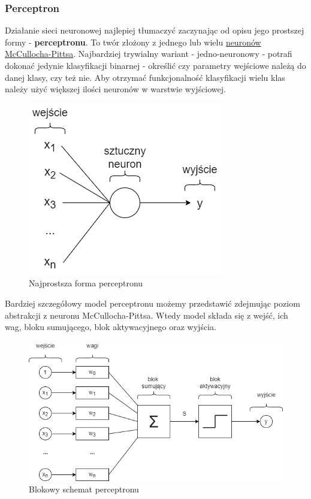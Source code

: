 \pagebreak

\subsubsection{Perceptron}
Działanie sieci neuronowej najlepiej tłumaczyć zaczynając od opisu jego prostszej formy - \textbf{perceptronu}. To twór złożony z jednego lub wielu \underline{neuronów McCullocha-Pittsa}. Najbardziej trywialny wariant - jedno-neuronowy - potrafi dokonać jedynie klasyfikacji binarnej - określić czy parametry wejściowe należą do danej klasy, czy też nie. Aby otrzymać funkcjonalność klasyfikacji wielu klas należy użyć większej ilości neuronów w warstwie wyjściowej.

\begin{figure}[h!]
    \begin{center}
        \includegraphics[scale=0.7]{img/perceptron.png}        
    \end{center}
    \caption{Najprostsza forma perceptronu}
    \label{fig:perceptron}
\end{figure}

Bardziej szczegółowy model perceptronu możemy przedstawić zdejmując poziom abstrakcji z neuronu McCullocha-Pittsa. Wtedy model składa się z wejść, ich wag, bloku sumującego, blok aktywacyjnego oraz wyjścia.

\begin{figure}[h!]
    \begin{center}
        \includegraphics[scale=0.65]{img/perceptron+.png}        
    \end{center}
    \caption{Blokowy schemat perceptronu \cite{wstepAGH}}
    \label{fig:blok_perceptron}
\end{figure}

